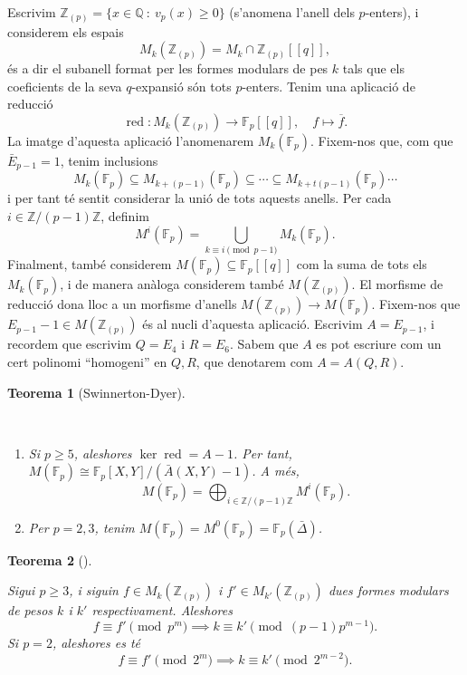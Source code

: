 \documentclass[
  letterpaper,
  DIV=11,
  numbers=noendperiod]{scrreprt}
\theoremstyle{plain}
\newtheorem{theorem}{Teorema}[chapter]
\theoremstyle{plain}
\theoremstyle{definition}
\theoremstyle{plain}
\theoremstyle{plain}
\theoremstyle{definition}
\theoremstyle{remark}
\begin{document}
Escrivim \(\mathbb{Z}_{(p)} = \{ x \in \mathbb{Q}~:~ v_p(x)\geq 0\}\)
(s'anomena l'anell dels \(p\)-enters), i considerem els espais \[
M_k(\mathbb{Z}_{(p)}) = M_k \cap \mathbb{Z}_{(p)}[[q]],
\] és a dir el subanell format per les formes modulars de pes \(k\) tals
que els coeficients de la seva \(q\)-expansió són tots \(p\)-enters.
Tenim una aplicació de reducció \[
\operatorname{red} \colon M_k(\mathbb{Z}_{(p)}) \longrightarrow\mathbb{F}_p[[q]], \quad f \mapsto \overline f.
\] La imatge d'aquesta aplicació l'anomenarem \(M_k(\mathbb{F}_p)\).
Fixem-nos que, com que \(\bar E_{p-1} = 1\), tenim inclusions \[
M_k(\mathbb{F}_p)\subseteq M_{k+(p-1)}(\mathbb{F}_p)\subseteq\cdots\subseteq M_{k+t(p-1)}(\mathbb{F}_p)\cdots
\] i per tant té sentit considerar la unió de tots aquests anells. Per
cada \(i\in \mathbb{Z}/(p-1)\mathbb{Z}\), definim \[
M^i(\mathbb{F}_p) = \bigcup_{k\equiv i\pmod{p-1}} M_k(\mathbb{F}_p).
\] Finalment, també considerem
\(M(\mathbb{F}_p)\subseteq \mathbb{F}_p[[q]]\) com la suma de tots els
\(M_k(\mathbb{F}_p)\), i de manera anàloga considerem també
\(M(\mathbb{Z}_{(p)})\). El morfisme de reducció dona lloc a un morfisme
d'anells \(M(\mathbb{Z}_{(p)})\longrightarrow M(\mathbb{F}_p)\).
Fixem-nos que \(E_{p-1}-1\in M(\mathbb{Z}_{(p)})\) és al nucli d'aquesta
aplicació. Escrivim \(A=E_{p-1}\), i recordem que escrivim \(Q=E_4\) i
\(R=E_6\). Sabem que \(A\) es pot escriure com un cert polinomi
``homogeni'' en \(Q,R\), que denotarem com \(A=A(Q,R)\).

\begin{theorem}[Swinnerton-Dyer]\protect\hypertarget{thm-swinnerton-dyer}{}\label{thm-swinnerton-dyer}

~

\begin{enumerate}
\def\labelenumi{\arabic{enumi}.}
\item
  Si \(p\geq 5\), aleshores \(\ker\operatorname{red} = A - 1\). Per
  tant, \(M(\mathbb{F}_p) \cong \mathbb{F}_p[X, Y]/(\bar A(X,Y) - 1)\).
  A més, \[
  M(\mathbb{F}_p) = \bigoplus_{i\in\mathbb{Z}/(p-1)\mathbb{Z}} M^i(\mathbb{F}_p).
  \]
\item
  Per \(p=2,3\), tenim
  \(M(\mathbb{F}_p) = M^0(\mathbb{F}_p)=\mathbb{F}_p(\bar\Delta)\).
\end{enumerate}

\end{theorem}

\begin{theorem}[]\protect\hypertarget{thm-}{}\label{thm-}

Sigui \(p\geq 3\), i siguin \(f\in M_k(\mathbb{Z}_{(p)})\) i
\(f'\in M_{k'}(\mathbb{Z}_{(p)})\) dues formes modulars de pesos \(k\) i
\(k'\) respectivament. Aleshores \[
f\equiv f'\pmod{p^m}\implies k\equiv k'\pmod{(p-1)p^{m-1}}.
\] Si \(p=2\), aleshores es té \[
f\equiv f'\pmod{2^m}\implies k\equiv k'\pmod{2^{m-2}}.
\]

\end{theorem}
\end{document}
